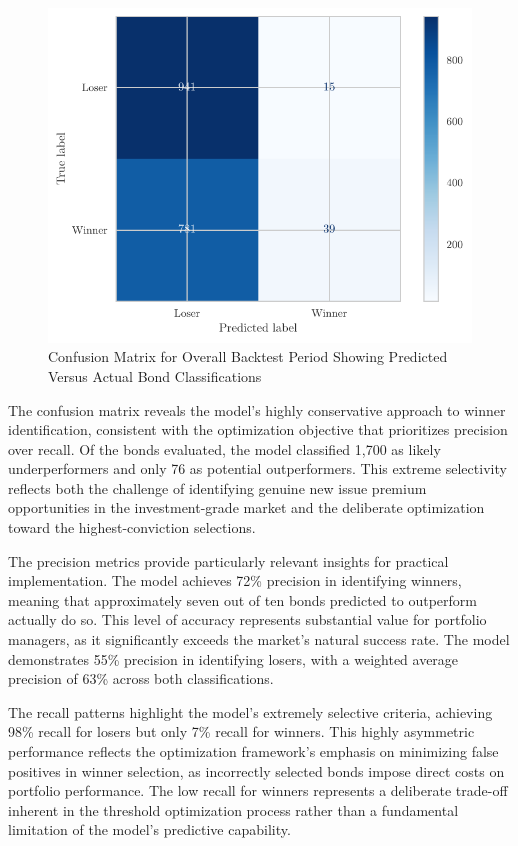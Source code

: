 \begin{figure}[h]
    \begin{center}
        \includegraphics[width=\textwidth]{images/confusion_matrix.pdf}
    \end{center}
    \caption{Confusion Matrix for Overall Backtest Period Showing Predicted Versus Actual Bond Classifications}
    \label{fig:confusion_matrix}
\end{figure}

The confusion matrix reveals the model's highly conservative approach to winner identification, consistent with the optimization objective that prioritizes precision over recall. Of the bonds evaluated, the model classified 1,700 as likely underperformers and only 76 as potential outperformers. This extreme selectivity reflects both the challenge of identifying genuine new issue premium opportunities in the investment-grade market and the deliberate optimization toward the highest-conviction selections.

The precision metrics provide particularly relevant insights for practical implementation. The model achieves 72\% precision in identifying winners, meaning that approximately seven out of ten bonds predicted to outperform actually do so. This level of accuracy represents substantial value for portfolio managers, as it significantly exceeds the market's natural success rate. The model demonstrates 55\% precision in identifying losers, with a weighted average precision of 63\% across both classifications.

The recall patterns highlight the model's extremely selective criteria, achieving 98\% recall for losers but only 7\% recall for winners. This highly asymmetric performance reflects the optimization framework's emphasis on minimizing false positives in winner selection, as incorrectly selected bonds impose direct costs on portfolio performance. The low recall for winners represents a deliberate trade-off inherent in the threshold optimization process rather than a fundamental limitation of the model's predictive capability.

